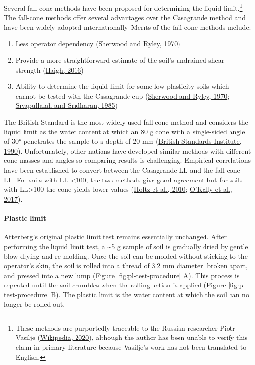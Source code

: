 \documentclass[
  letterpaper,
  openany]{book}
\providecommand{\tightlist}{%
  \setlength{\itemsep}{0pt}\setlength{\parskip}{0pt}}
\begin{document}
Several fall-cone methods have been proposed for determining the liquid limit.\footnote{These methods are purportedly traceable to the Russian researcher Piotr Vasilje (\protect\hyperlink{ref-wikipediafallcone2021}{Wikipedia, 2020}), although the author has been unable to verify this claim in primary literature because Vasilje's work has not been translated to English.}
The fall-cone methods offer several advantages over the Casagrande method and have been widely adopted internationally.
Merits of the fall-cone methods include:

\begin{enumerate}
\def\labelenumi{\arabic{enumi}.}
\tightlist
\item
  Less operator dependency (\protect\hyperlink{ref-Sherwood1970a}{Sherwood and Ryley, 1970})
\item
  Provide a more straightforward estimate of the soil's undrained shear strength (\protect\hyperlink{ref-Haigh2016}{Haigh, 2016})
\item
  Ability to determine the liquid limit for some low-plasticity soils which cannot be tested with the Casagrande cup (\protect\hyperlink{ref-Sherwood1970a}{Sherwood and Ryley, 1970}; \protect\hyperlink{ref-Sivapullaiah1985}{Sivapullaiah and Sridharan, 1985})
\end{enumerate}

The British Standard is the most widely-used fall-cone method and considers the liquid limit as the water content at which an 80 g cone with a single-sided angle of 30° penetrates the sample to a depth of 20 mm (\protect\hyperlink{ref-BS13771990}{British Standards Institute, 1990}).
Unfortunately, other nations have developed similar methods with different cone masses and angles so comparing results is challenging.
Empirical correlations have been established to convert between the Casagrande LL and the fall-cone LL.
For soils with LL \textless100, the two methods give good agreement but for soils with LL\textgreater100 the cone yields lower values (\protect\hyperlink{ref-Holtz2010}{Holtz et al., 2010}; \protect\hyperlink{ref-OKelly2017}{O'Kelly et al., 2017}).

\hypertarget{plastic-limit}{%
\paragraph{Plastic limit}\label{plastic-limit}}

Atterberg's original plastic limit test remains essentially unchanged.
After performing the liquid limit test, a \textasciitilde5 g sample of soil is gradually dried by gentle blow drying and re-molding.
Once the soil can be molded without sticking to the operator's skin, the soil is rolled into a thread of 3.2 mm diameter, broken apart, and pressed into a new lump (Figure \ref{fig:pl-test-procedure} A).
This process is repeated until the soil crumbles when the rolling action is applied (Figure \ref{fig:pl-test-procedure} B).
The plastic limit is the water content at which the soil can no longer be rolled out.
\end{document}
